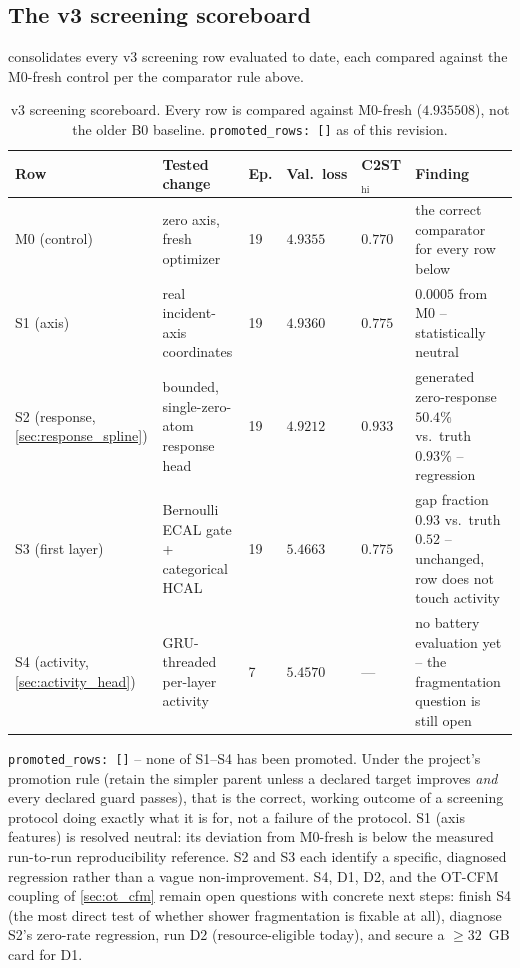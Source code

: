 \documentclass[10pt,a4paper]{article}
\begin{document}
\subsection{The v3 screening scoreboard}
\label{sec:screening}
 consolidates every v3 screening row evaluated to date, each compared against the M0-fresh control per the comparator rule above.

\begin{table}[ht]
\centering
\caption{v3 screening scoreboard. Every row is compared against M0-fresh ($4.935508$), not the older B0 baseline. \texttt{promoted\_rows: []} as of this revision.}
\label{tab:screening}
\begin{tabularx}{\textwidth}{@{}p{}p{}p{}p{}p{}Y@{}}
\toprule
Row & Tested change & Ep. & Val.\ loss & C2ST$_{\mathrm{hi}}$ & Finding \\
\midrule
M0 (control) & zero axis, fresh optimizer & 19 & $4.9355$ & $0.770$ & the correct comparator for every row below \\
S1 (axis) & real incident-axis coordinates & 19 & $4.9360$ & $0.775$ & $0.0005$ from M0 -- statistically neutral \\
S2 (response, \cref{sec:response_spline}) & bounded, single-zero-atom response head & 19 & $4.9212$ & $0.933$ & generated zero-response $50.4\%$ vs.\ truth $0.93\%$ -- regression \\
S3 (first layer) & Bernoulli ECAL gate + categorical HCAL & 19 & $5.4663$ & $0.775$ & gap fraction $0.93$ vs.\ truth $0.52$ -- unchanged, row does not touch activity \\
S4 (activity, \cref{sec:activity_head}) & GRU-threaded per-layer activity & 7 & $5.4570$ & --- & no battery evaluation yet -- the fragmentation question is still open \\
\bottomrule
\end{tabularx}
\end{table}

\texttt{promoted\_rows: []} -- none of S1--S4 has been promoted. Under the project's promotion rule (retain the simpler parent unless a declared target improves \emph{and} every declared guard passes), that is the correct, working outcome of a screening protocol doing exactly what it is for, not a failure of the protocol. S1 (axis features) is resolved neutral: its deviation from M0-fresh is below the measured run-to-run reproducibility reference. S2 and S3 each identify a specific, diagnosed regression rather than a vague non-improvement. S4, D1, D2, and the OT-CFM coupling of \cref{sec:ot_cfm} remain open questions with concrete next steps: finish S4 (the most direct test of whether shower fragmentation is fixable at all), diagnose S2's zero-rate regression, run D2 (resource-eligible today), and secure a $\ge32$~GB card for D1.
\end{document}
